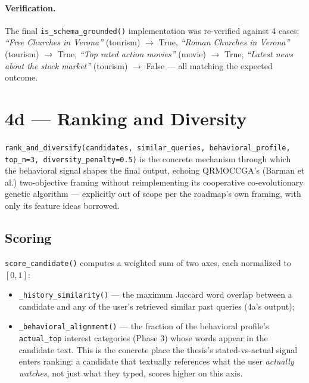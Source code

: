 \documentclass[11pt,a4paper]{article}
\newcommand{\code}[1]{\texttt{#1}}
\begin{document}
\paragraph{Verification.} The final \code{is\_schema\_grounded()} implementation was re-verified
against 4 cases: \emph{``Free Churches in Verona''} (tourism) $\to$ True, \emph{``Roman Churches in
Verona''} (tourism) $\to$ True, \emph{``Top rated action movies''} (movie) $\to$ True,
\emph{``Latest news about the stock market''} (tourism) $\to$ False --- all matching the expected
outcome.

\newpage
\section{4d --- Ranking and Diversity}

\code{rank\_and\_diversify(candidates, similar\_queries, behavioral\_profile, top\_n=3,
diversity\_penalty=0.5)} is the concrete mechanism through which the behavioral signal shapes the
final output, echoing QRMOCCGA's (Barman et al.) two-objective framing without reimplementing its
cooperative co-evolutionary genetic algorithm --- explicitly out of scope per the roadmap's own
framing, with only its feature ideas borrowed.

\subsection{Scoring}

\code{score\_candidate()} computes a weighted sum of two axes, each normalized to $[0,1]$:

\begin{itemize}
    \item \code{\_history\_similarity()} --- the maximum Jaccard word overlap between a candidate
        and any of the user's retrieved similar past queries (4a's output);
    \item \code{\_behavioral\_alignment()} --- the fraction of the behavioral profile's
        \code{actual\_top} interest categories (Phase 3) whose words appear in the candidate text.
        This is the concrete place the thesis's stated-vs-actual signal enters ranking: a candidate
        that textually references what the user \emph{actually watches}, not just what they typed,
        scores higher on this axis.
\end{itemize}
\end{document}
